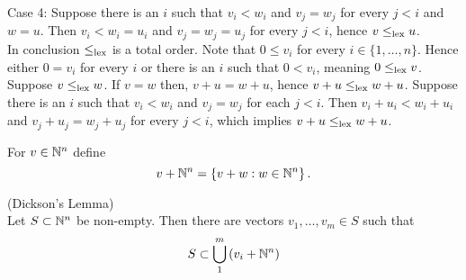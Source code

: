 \begin{example}
\begin{enumerate}
        Case 4: Suppose there is an $i$ such that $v_i<w_i$ and $v_j=w_j$ for every $j<i$ and $w = u$. Then $v_i < w_i = u_i$ and $v_j=w_j = u_j$ for every $j<i$, hence $v\leq_{\text{lex}} u$.\\
        In conclusion $\leq_{\text{lex}}$ is a total order. Note that $0 \leq v_i$ for every $i\in \{1,\dots,n\}$. Hence either $0=v_i$ for every $i$ or there is an $i$ such that $0< v_i$, meaning $0\leq_{\text{lex}} v$. Suppose $v\leq_{\text{lex}} w$. If $v=w$ then, $v+u = w+ u$, hence $v+u\leq_{\text{lex}} w+u$. Suppose there is an $i$ such that $v_i<w_i$ and $v_j = w_j$ for each $j<i$. Then $v_i+u_i < w_i + u_i$ and $v_j+u_j = w_j + u_j$ for every $j<i$, which implies $v + u \leq_{\text{lex}} w + u$. 
    \end{enumerate} 
\end{example}
For $v\in \mathbb{N}^n$ define 
$$v + \mathbb{N}^n = \left\{ v +w  : w\in \mathbb{N}^n\right\}.$$
\begin{theorem}\label{Dickson's lemma}(Dickson's Lemma)\\
    Let $S\subset \mathbb{N}^n$ be non-empty. Then there are vectors $v_1,\dots,v_m\in S$ such that 
    $$S\subset \bigcup_1^m \left(v_i +\mathbb{N}^n\right)$$
\end{theorem}
